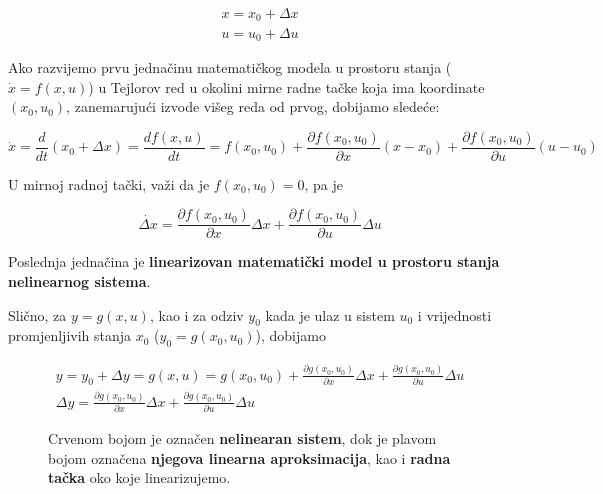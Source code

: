 \documentclass[12pt]{IEEEtran}
\numberwithin{equation}{subsection}
\numberwithin{figure}{section}
\begin{document}
\begin{gather}
    x = x_{0} + \Delta{x}\\
    u = u_{0} + \Delta{u}
\end{gather}

Ako razvijemo prvu jedna\v{c}inu matemati\v{c}kog modela u prostoru stanja
($\dot{x} = f(x, u)$) u Tejlorov red u okolini mirne radne ta\v{c}ke koja
ima koordinate $(x_{0}, u_{0})$, zanemaruju\'{c}i izvode 
vi\v{s}eg reda od prvog, dobijamo slede\'{c}e:

\begin{equation}
    \dot{x} = \frac{d}{dt}{(x_{0} + \Delta{x})} = \frac{df(x, u)}{dt} = f(x_{0}, u_{0}) + \frac{\partial f(x_0, u_0)}{\partial x}(x - x_{0}) + \frac{\partial f(x_0, u_0)}{\partial u}(u - u_{0})
\end{equation}

U mirnoj radnoj ta\v{c}ki, va\v{z}i da je $f(x_{0}, u_{0}) = 0$, pa je

\begin{equation}
    \dot{\Delta{x}} = \frac{\partial f(x_{0}, u_{0})}{\partial x}\Delta{x} + \frac{\partial f(x_{0}, u_{0})}{\partial u}\Delta{u}
\end{equation}

Poslednja jedna\v{c}ina je \textbf{linearizovan matemati\v{c}ki model u prostoru stanja nelinearnog sistema}.

Sli\v{c}no, za $y = g(x, u)$, kao i za odziv $y_{0}$ kada je ulaz u sistem $u_0$
i vrijednosti promjenljivih stanja $x_{0}$ ($y_{0} = g(x_{0}, u_{0})$), dobijamo

\begin{gather}
    y = y_{0} + \Delta{y} = g(x, u) = g(x_{0}, u_{0}) + \frac{\partial g(x_{0}, u_{0})}{\partial x}\Delta{x} + \frac{\partial g(x_{0}, u_{0})}{\partial u}\Delta{u}\\
    \Delta{y} = \frac{\partial g(x_{0}, u_{0})}{\partial x}\Delta{x} + \frac{\partial g(x_{0}, u_{0})}{\partial u}\Delta{u}
\end{gather}

\begin{figure}[h]
    \centering
    \caption{Crvenom bojom je ozna\v{c}en \textbf{nelinearan sistem},
        dok je plavom bojom ozna\v{c}ena \textbf{njegova linearna aproksimacija},
        kao i \textbf{radna ta\v{c}ka} oko koje linearizujemo.}
\end{figure}
\end{document}
